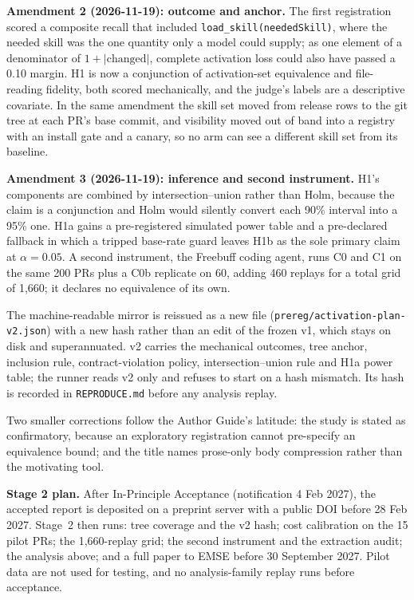 \documentclass[10pt,conference]{IEEEtran}
\begin{document}
\textbf{Amendment 2 (2026-11-19): outcome and anchor.} The first registration scored a composite recall that included \texttt{load\_skill(neededSkill)}, where the needed skill was the one quantity only a model could supply; as one element of a denominator of $1+|\mathrm{changed}|$, complete activation loss could also have passed a 0.10 margin. H1 is now a conjunction of activation-set equivalence and file-reading fidelity, both scored mechanically, and the judge's labels are a descriptive covariate. In the same amendment the skill set moved from release rows to the git tree at each PR's base commit, and visibility moved out of band into a registry with an install gate and a canary, so no arm can see a different skill set from its baseline.

\textbf{Amendment 3 (2026-11-19): inference and second instrument.} H1's components are combined by intersection--union rather than Holm, because the claim is a conjunction and Holm would silently convert each 90\% interval into a 95\% one. H1a gains a pre-registered simulated power table and a pre-declared fallback in which a tripped base-rate guard leaves H1b as the sole primary claim at $\alpha=0.05$. A second instrument, the Freebuff coding agent, runs C0 and C1 on the same 200 PRs plus a C0b replicate on 60, adding 460 replays for a total grid of 1{,}660; it declares no equivalence of its own.

The machine-readable mirror is reissued as a new file (\texttt{prereg/activation-plan-v2.json}) with a new hash rather than an edit of the frozen v1, which stays on disk and superannuated. v2 carries the mechanical outcomes, tree anchor, inclusion rule, contract-violation policy, intersection--union rule and H1a power table; the runner reads v2 only and refuses to start on a hash mismatch. Its hash is recorded in \texttt{REPRODUCE.md} before any analysis replay.

Two smaller corrections follow the Author Guide's latitude: the study is stated as confirmatory, because an exploratory registration cannot pre-specify an equivalence bound; and the title names prose-only body compression rather than the motivating tool.

\textbf{Stage 2 plan.} After In-Principle Acceptance (notification 4 Feb 2027), the accepted report is deposited on a preprint server with a public DOI before 28 Feb 2027. Stage~2 then runs: tree coverage and the v2 hash; cost calibration on the 15 pilot PRs; the 1{,}660-replay grid; the second instrument and the extraction audit; the analysis above; and a full paper to EMSE before 30 September 2027. Pilot data are not used for testing, and no analysis-family replay runs before acceptance.
\end{document}
